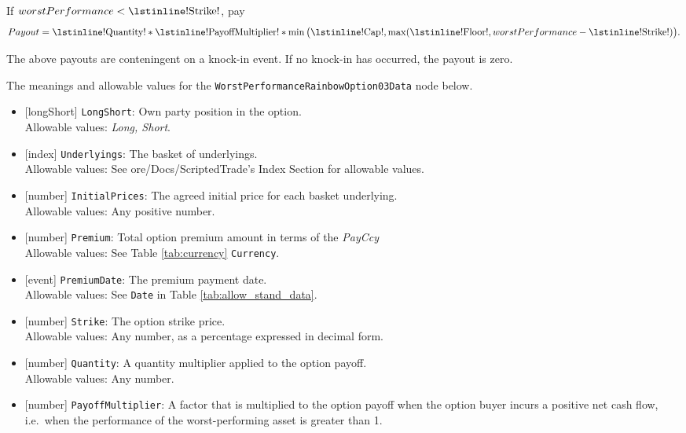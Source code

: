 If $worstPerformance < \text{\lstinline!Strike!}$, pay
\begin{equation*}
  Payout = \text{\lstinline!Quantity!} * \text{\lstinline!PayoffMultiplier!} * \min\big(\text{\lstinline!Cap!}, \max(\text{\lstinline!Floor!}, worstPerformance - \text{\lstinline!Strike!})\big).
\end{equation*}

The above payouts are conteningent on a knock-in event. If no knock-in has occurred, the payout is zero.

The meanings and allowable values for the \lstinline!WorstPerformanceRainbowOption03Data! node below.

\begin{itemize} 
  \item{}[longShort] \lstinline!LongShort!: Own party position in the option. \\
  Allowable values: \emph{Long, Short}.
  \item{}[index] \lstinline!Underlyings!: The basket of underlyings. \\
  Allowable values: See ore/Docs/ScriptedTrade's Index Section for allowable values.
  \item{}[number] \lstinline!InitialPrices!: The agreed initial price for each basket underlying. \\
  Allowable values: Any positive number.
  \item{}[number] \lstinline!Premium!: Total option premium amount in terms of the \emph{PayCcy} \\
  Allowable values: See Table \ref{tab:currency} \lstinline!Currency!.
  \item{}[event] \lstinline!PremiumDate!: The premium payment date. \\
  Allowable values: See \lstinline!Date! in Table \ref{tab:allow_stand_data}.
  \item{}[number] \lstinline!Strike!: The option strike price. \\
  Allowable values: Any number, as a percentage expressed in decimal form.
  \item{}[number] \lstinline!Quantity!: A quantity multiplier applied to the option payoff. \\
  Allowable values: Any number.
  \item{}[number] \lstinline!PayoffMultiplier!: A factor that is multiplied to the option payoff when the option buyer incurs 
  a positive net cash flow, i.e.\ when the performance of the worst-performing asset is greater than 1. \\

\end{itemize}
